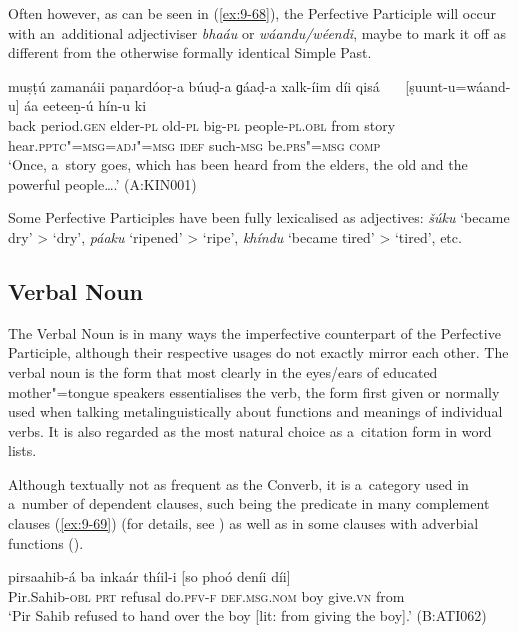 Often however, as can be seen in (\ref{ex:9-68}), the Perfective Participle will occur with an~additional adjectiviser \textit{bhaáu} or \textit{wáandu/wéendi}, maybe to mark it off as different from the otherwise formally identical Simple Past.

\begin{exe}
\ex
\label{ex:9-68}
\gll muṣṭú zamanáii paṇardóoṛ-a búuḍ-a ɡáaḍ-a xalk-íim díi {qisá~~~} [ṣuunt-u=wáand-u] áa eeteeṇ-ú hín-u ki\\
back period.\textsc{gen} elder-\textsc{pl} old-\textsc{pl} big-\textsc{pl}  people-\textsc{pl.obl} from story hear.\textsc{pptc"=msg=adj"=msg} \textsc{idef} such-\textsc{msg} be.\textsc{prs"=msg} \textsc{comp} \\
\glt `Once, a~story goes, which has been heard from the elders, the old and the powerful people{\ldots}.'
(A:KIN001)
\end{exe}

Some Perfective Participles have been fully lexicalised as adjectives: \textit{šúku} `became dry' {\textgreater} `dry', \textit{páaku} `ripened' {\textgreater} `ripe', \textit{khíndu} `became tired' {\textgreater} `tired', etc.


\subsection{Verbal Noun}
\label{subsec:9-3-3}


The Verbal Noun is in many ways the imperfective counterpart of the Perfective Participle, although their respective usages do not exactly mirror each other. The verbal noun is the form that most clearly in the eyes/ears of educated mother"=tongue speakers essentialises the verb, the form first given or normally used when talking metalinguistically about functions and meanings of individual verbs. It is also regarded as the most natural choice as a~citation form in word lists. 


Although textually not as frequent as the Converb, it is a~category used in a~number of dependent clauses, such being the predicate in many complement clauses (\ref{ex:9-69}) (for details, see ) as well as in some clauses with adverbial functions ().

\begin{exe}
\ex
\label{ex:9-69}
\gll pirsaahib-á ba inkaár thíil-i [so phoó deníi díi] \\
Pir.Sahib-\textsc{obl} \textsc{prt} refusal do.\textsc{pfv-f} \textsc{def.msg.nom} boy give.\textsc{vn} from \\
\glt `Pir Sahib refused to hand over the boy [lit: from giving the boy].' (B:ATI062)
\end{exe}

